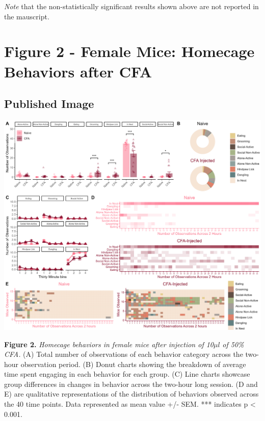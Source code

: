 \documentclass[
]{book}
\begin{document}
\emph{Note} that the non-statistically significant results shown above are not reported in the mauscript.

\hypertarget{figure-2---female-mice-homecage-behaviors-after-cfa}{%
\chapter*{Figure 2 - Female Mice: Homecage Behaviors after CFA}\label{figure-2---female-mice-homecage-behaviors-after-cfa}}

\hypertarget{published-image-1}{%
\section*{Published Image}\label{published-image-1}}

\includegraphics[width=45.83in]{Figs/2_female_HC_panel}

\textbf{Figure 2.} \emph{Homecage behaviors in female mice after injection of 10}\(\mu l\) \emph{of 50\% CFA.} (A) Total number of observations of each behavior category across the two-hour observation period. (B) Donut charts showing the breakdown of average time spent engaging in each behavior for each group. (C) Line charts showcase group differences in changes in behavior across the two-hour long session. (D and E) are qualitative representations of the distribution of behaviors observed across the 40 time points. Data represented as mean value +/- SEM. *** indicates p \textless{} 0.001.
\end{document}
